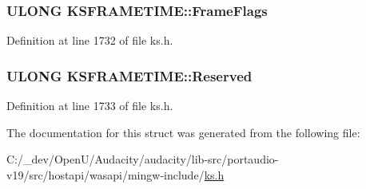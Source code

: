 \subsubsection[{\texorpdfstring{Frame\+Flags}{FrameFlags}}]{\setlength{\rightskip}{0pt plus 5cm}U\+L\+O\+NG K\+S\+F\+R\+A\+M\+E\+T\+I\+M\+E\+::\+Frame\+Flags}\hypertarget{struct_k_s_f_r_a_m_e_t_i_m_e_a49e9bf0ab7597ae51918d48103b39fb9}{}\label{struct_k_s_f_r_a_m_e_t_i_m_e_a49e9bf0ab7597ae51918d48103b39fb9}


Definition at line 1732 of file ks.\+h.

\subsubsection[{\texorpdfstring{Reserved}{Reserved}}]{\setlength{\rightskip}{0pt plus 5cm}U\+L\+O\+NG K\+S\+F\+R\+A\+M\+E\+T\+I\+M\+E\+::\+Reserved}\hypertarget{struct_k_s_f_r_a_m_e_t_i_m_e_a582071b07f756a21ae3bf04475ea1c8e}{}\label{struct_k_s_f_r_a_m_e_t_i_m_e_a582071b07f756a21ae3bf04475ea1c8e}


Definition at line 1733 of file ks.\+h.



The documentation for this struct was generated from the following file\+:\begin{DoxyCompactItemize}
\item 
C\+:/\+\_\+dev/\+Open\+U/\+Audacity/audacity/lib-\/src/portaudio-\/v19/src/hostapi/wasapi/mingw-\/include/\hyperlink{ks_8h}{ks.\+h}\end{DoxyCompactItemize}
